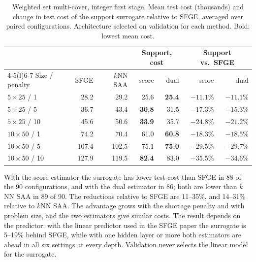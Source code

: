 \documentclass[11pt,a4paper]{article}
\theoremstyle{remark}
\begin{document}
\begin{table}[h]
\centering\small
\caption{Weighted set multi-cover, integer first stage. Mean test cost
(thousands) and change in test cost of the support surrogate relative to SFGE,
averaged over paired configurations. Architecture selected on validation for
each method. Bold: lowest mean cost.}\label{tab:wsmc}
\begin{tabular}{@{}lrrrrrr@{}}
\toprule
 & & & \multicolumn{2}{c}{Support, cost} & \multicolumn{2}{c}{Support vs.\ SFGE}\\
\cmidrule(lr){4-5}\cmidrule(l){6-7}
Size / penalty & SFGE & $k$NN SAA & score & dual & score & dual\\
\midrule
$5\times25$ / 1  & 28.2 & 29.2 & 25.6 & \textbf{25.4} & $-11.1\%$ & $-11.1\%$\\
$5\times25$ / 5  & 36.7 & 43.4 & \textbf{30.8} & 31.5 & $-17.3\%$ & $-15.3\%$\\
$5\times25$ / 10 & 45.6 & 50.6 & \textbf{33.9} & 35.7 & $-24.8\%$ & $-21.2\%$\\
$10\times50$ / 1  & 74.2 & 70.4 & 61.0 & \textbf{60.8} & $-18.3\%$ & $-18.5\%$\\
$10\times50$ / 5  & 107.4 & 102.5 & 75.1 & \textbf{75.0} & $-29.5\%$ & $-29.7\%$\\
$10\times50$ / 10 & 127.9 & 119.5 & \textbf{82.4} & 83.0 & $-35.5\%$ & $-34.6\%$\\
\bottomrule
\end{tabular}
\end{table}

With the score estimator the surrogate has lower test cost than SFGE in 88 of
the 90 configurations, and with the dual estimator in 86; both are lower than
$k$NN SAA in 89 of 90. The reductions relative to SFGE are 11--35\%, and
14--31\% relative to $k$NN SAA. The advantage grows with the shortage penalty
and with problem size, and the two estimators give similar costs. The result
depends on the predictor: with the linear predictor used in the SFGE paper the
surrogate is 5--19\% behind SFGE, while with one hidden layer or more both
estimators are ahead in all six settings at every depth. Validation never
selects the linear model for the surrogate.
\end{document}

